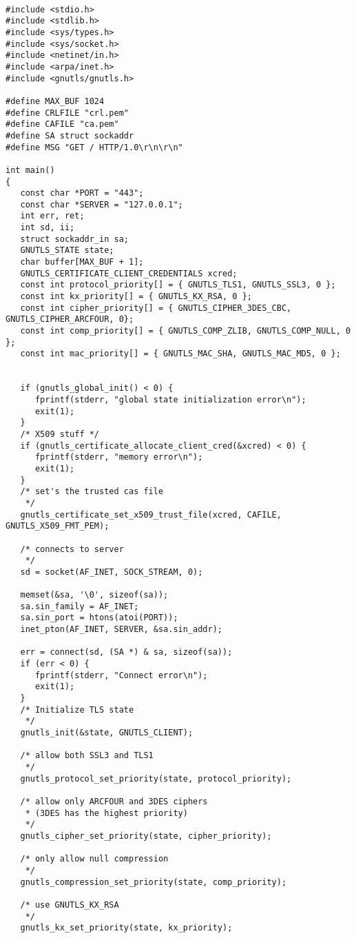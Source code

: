 \begin{verbatim}

#include <stdio.h>
#include <stdlib.h>
#include <sys/types.h>
#include <sys/socket.h>
#include <netinet/in.h>
#include <arpa/inet.h>
#include <gnutls/gnutls.h>

#define MAX_BUF 1024
#define CRLFILE "crl.pem"
#define CAFILE "ca.pem"
#define SA struct sockaddr
#define MSG "GET / HTTP/1.0\r\n\r\n"

int main()
{
   const char *PORT = "443";
   const char *SERVER = "127.0.0.1";
   int err, ret;
   int sd, ii;
   struct sockaddr_in sa;
   GNUTLS_STATE state;
   char buffer[MAX_BUF + 1];
   GNUTLS_CERTIFICATE_CLIENT_CREDENTIALS xcred;
   const int protocol_priority[] = { GNUTLS_TLS1, GNUTLS_SSL3, 0 };
   const int kx_priority[] = { GNUTLS_KX_RSA, 0 };
   const int cipher_priority[] = { GNUTLS_CIPHER_3DES_CBC, GNUTLS_CIPHER_ARCFOUR, 0};
   const int comp_priority[] = { GNUTLS_COMP_ZLIB, GNUTLS_COMP_NULL, 0 };
   const int mac_priority[] = { GNUTLS_MAC_SHA, GNUTLS_MAC_MD5, 0 };


   if (gnutls_global_init() < 0) {
      fprintf(stderr, "global state initialization error\n");
      exit(1);
   }
   /* X509 stuff */
   if (gnutls_certificate_allocate_client_cred(&xcred) < 0) {  
      fprintf(stderr, "memory error\n");
      exit(1);
   }
   /* set's the trusted cas file
    */
   gnutls_certificate_set_x509_trust_file(xcred, CAFILE, GNUTLS_X509_FMT_PEM);

   /* connects to server 
    */
   sd = socket(AF_INET, SOCK_STREAM, 0);

   memset(&sa, '\0', sizeof(sa));
   sa.sin_family = AF_INET;
   sa.sin_port = htons(atoi(PORT));
   inet_pton(AF_INET, SERVER, &sa.sin_addr);

   err = connect(sd, (SA *) & sa, sizeof(sa));
   if (err < 0) {
      fprintf(stderr, "Connect error\n");
      exit(1);
   }
   /* Initialize TLS state 
    */
   gnutls_init(&state, GNUTLS_CLIENT);

   /* allow both SSL3 and TLS1
    */
   gnutls_protocol_set_priority(state, protocol_priority);

   /* allow only ARCFOUR and 3DES ciphers
    * (3DES has the highest priority)
    */
   gnutls_cipher_set_priority(state, cipher_priority);

   /* only allow null compression
    */
   gnutls_compression_set_priority(state, comp_priority);

   /* use GNUTLS_KX_RSA
    */
   gnutls_kx_set_priority(state, kx_priority);


\end{verbatim}
